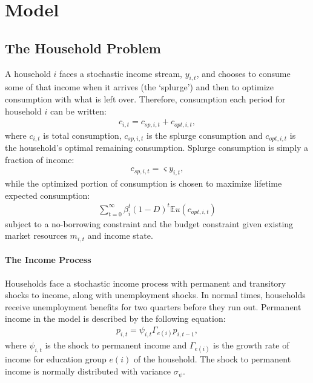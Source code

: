 \documentclass[11pt]{article}
\begin{document}
	\section{Model}
	\subsection{The Household Problem}
	A household $i$ faces a stochastic income stream, $y_{i,t}$, and chooses to consume some of that income when it arrives (the `splurge') and then to optimize consumption with what is left over. Therefore, consumption each period for household $i$ can be written:
	\begin{align}
		c_{i,t} = c_{sp,i,t} + c_{opt,i,t},
	\end{align}
	where $c_{i,t}$ is total consumption, $c_{sp,i,t}$ is the splurge consumption and $c_{opt,i,t}$ is the household's optimal remaining consumption. Splurge consumption is simply a fraction of income:
	\begin{align}
	c_{sp,i,t} = \varsigma y_{i,t},
	\end{align}
	while the optimized portion of consumption is chosen to maximize lifetime expected consumption:
	\begin{align}
	\sum_{t=0}^{\infty}\beta_i^t (1-D)^t \mathbb{E}u(c_{opt,i,t})
	\end{align}
	subject to a no-borrowing constraint and the budget constraint given existing market resources $m_{i,t}$ and income state.
	\paragraph{The Income Process}
	Households face a stochastic income process with permanent and transitory shocks to income, along with unemployment shocks. In normal times, households receive unemployment benefits for two quarters before they run out. Permanent income in the model is described by the following equation:
	\begin{align}
	p_{i,t} = \psi_{i,t}\Gamma_{e(i)}p_{i,t-1},
	\end{align}
	where $\psi_{i,t}$ is the shock to permanent income and $\Gamma_{e(i)}$ is the growth rate of income for education group $e(i)$ of the household. The shock to permanent income is normally distributed with variance $\sigma_{\psi}$.
	
\end{document}
